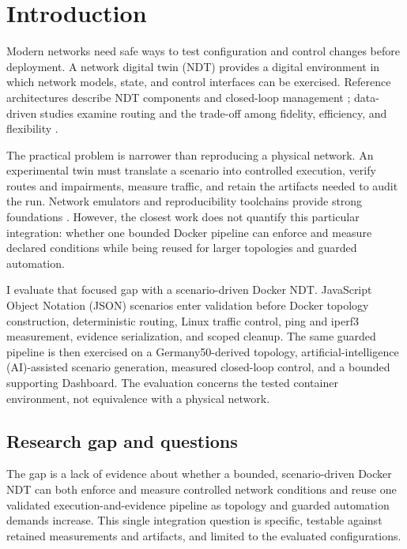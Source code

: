\section{Introduction}
\label{sec:introduction}

Modern networks need safe ways to test configuration and control changes before deployment. A network digital twin (NDT) provides a digital environment in which network models, state, and control interfaces can be exercised. Reference architectures describe NDT components and closed-loop management \citep{zhou2026ndt,itut2022y3090}; data-driven studies examine routing and the trade-off among fidelity, efficiency, and flexibility \citep{almasan2022ndt,hui2023digitaltwin}.

The practical problem is narrower than reproducing a physical network. An experimental twin must translate a scenario into controlled execution, verify routes and impairments, measure traffic, and retain the artifacts needed to audit the run. Network emulators and reproducibility toolchains provide strong foundations \citep{lantz2010network,handigol2012reproducible,gallenmuller2021pos}. However, the closest work does not quantify this particular integration: whether one bounded Docker pipeline can enforce and measure declared conditions while being reused for larger topologies and guarded automation.

I evaluate that focused gap with a scenario-driven Docker NDT. JavaScript Object Notation (JSON) scenarios enter validation before Docker topology construction, deterministic routing, Linux traffic control, ping and iperf3 measurement, evidence serialization, and scoped cleanup. The same guarded pipeline is then exercised on a Germany50-derived topology, artificial-intelligence (AI)-assisted scenario generation, measured closed-loop control, and a bounded supporting Dashboard. The evaluation concerns the tested container environment, not equivalence with a physical network.

\subsection{Research gap and questions}

The gap is a lack of evidence about whether a bounded, scenario-driven Docker NDT can both enforce and measure controlled network conditions and reuse one validated execution-and-evidence pipeline as topology and guarded automation demands increase. This single integration question is specific, testable against retained measurements and artifacts, and limited to the evaluated configurations.

